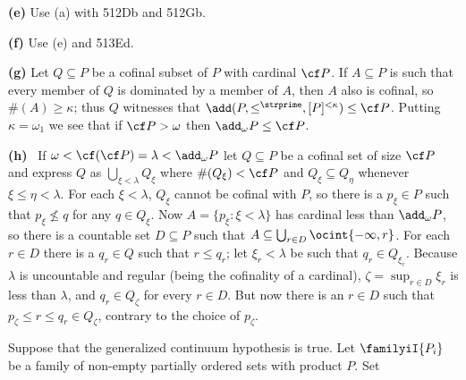 {\medskip

{\bf (e)} Use (a) with 512Db and 512Gb.

\medskip

{\bf (f)} Use (e) and 513Ed.

\medskip

{\bf (g)} Let $Q\subseteq P$ be a cofinal subset of $P$ with cardinal
$\cf P$.   If $A\subseteq P$ is such that every member of $Q$ is
dominated by a member of $A$, then $A$ also is cofinal, so
$\#(A)\ge\kappa$;  thus $Q$ witnesses that
$\add(P,\le^{\strprime},[P]^{<\kappa})\le\cf P$.   Putting
$\kappa=\omega_1$
we see that if $\cf P>\omega$ then $\add_{\omega}P\le\cf P$.

\medskip

{\bf (h)} \Quer\ If
$\omega<\cf(\cf P)=\lambda<\add_{\omega}P$ let
$Q\subseteq P$ be a cofinal set of size $\cf P$ and express $Q$ as
$\bigcup_{\xi<\lambda}Q_{\xi}$ where $\#(Q_{\xi})<\cf P$ and
$Q_{\xi}\subseteq Q_{\eta}$ whenever $\xi\le\eta<\lambda$.   For each
$\xi<\lambda$, $Q_{\xi}$ cannot be cofinal with $P$, so there is a
$p_{\xi}\in P$ such that $p_{\xi}\not\le q$ for any $q\in Q_{\xi}$.
Now $A=\{p_{\xi}:\xi<\lambda\}$ has cardinal less than $\add_{\omega}P$,
so there is a countable set $D\subseteq P$ such that
$A\subseteq\bigcup_{r\in D}\ocint{-\infty,r}$.   For each $r\in D$ there
is a $q_r\in Q$ such that $r\le q_r$;  let $\xi_r<\lambda$ be such that
$q_r\in Q_{\xi_r}$.   Because $\lambda$ is uncountable and regular
(being the cofinality of a cardinal), $\zeta=\sup_{r\in D}\xi_r$ is less
than $\lambda$, and $q_r\in Q_{\zeta}$ for every $r\in D$.   But now
there is an $r\in D$ such that $p_{\zeta}\le r\le q_r\in Q_{\zeta}$,
contrary to the choice of $p_{\zeta}$.\ \Bang
}%


 Suppose that the generalized continuum
hypothesis is true.    Let $\familyiI{P_i}$ be a family of
non-empty partially ordered sets with product $P$.  Set

